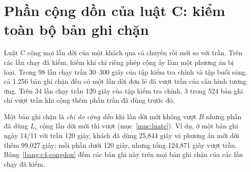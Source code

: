 \section{Phần cộng dồn của luật C: kiểm toàn bộ bản ghi chặn}
\label{muc:c4-congdon}

Luật C cộng mọi lần dời của một khách qua cả chuyến rồi mới so với trần. Trên các lần chạy đã kiểm, hiếm khi chỉ riêng
phép cộng ấy làm một phương án bị loại. Trong 98 lần chạy trần 30--300 giây của tập kiểm tra chính và tập buổi sáng,
cả 1.256 bản ghi chặn đều có một lần dời đơn lẻ đã vượt trần của cấu hình tương ứng. Trên 34 lần chạy trần 120 giây
của tập kiểm tra chính, 3 trong 524 bản ghi chỉ vượt trần khi cộng thêm phần trần đã dùng trước đó.

Một bản ghi chặn là \emph{chỉ do cộng dồn} khi lần dời mới không vượt $B$ nhưng phần đã dùng $L_r$ cộng lần dời mới
thì vượt (mục~\ref{muc:luatc}). Ví dụ, ở một bản ghi ngày 14/11 với trần 120 giây, khách đã dùng 25,844 giây và phương
án mới dời thêm 99,027 giây: mỗi phần dưới 120 giây, nhưng tổng 124,871 giây vượt trần. Bảng~\ref{bang:c4-congdon} đếm
các bản ghi này trên mọi bản ghi chặn của các lần chạy đã kiểm.


